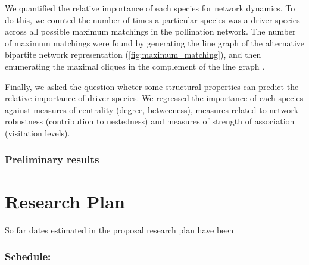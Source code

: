 \documentclass[a4paper]{article}
\begin{document}
We quantified the relative importance of each species for network dynamics. To do this, we counted the number of times a particular species was a driver species across all possible maximum matchings in the pollination network. The number of maximum matchings were found by generating the line graph of the alternative bipartite network representation (\autoref{fig:maximum_matching}), and then enumerating the maximal cliques in the complement of the line graph \autocite{Csardi2006}. 

Finally, we asked the question wheter some structural properties can predict the relative importance of driver species. We regressed the importance of each species against measures of centrality (degree, betweeness), measures related to network robustness (contribution to nestedness) and measures of strength of association (visitation levels). 

\subsubsection*{Preliminary results} 


\section*{Research Plan}

So far dates estimated in the proposal research plan have been 

\subsubsection*{Schedule:}
 
\printbibliography
\end{document}

